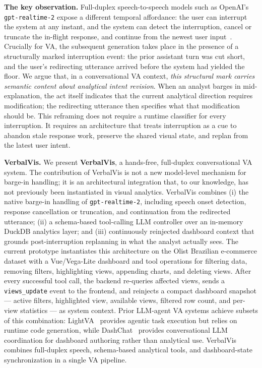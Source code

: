 \documentclass[journal]{IEEEtran}
\begin{document}
\textbf{The key observation.}
Full-duplex speech-to-speech models such as OpenAI's \texttt{gpt-realtime-2} expose a different temporal affordance: the user can interrupt the system at any instant, and the system can detect the interruption, cancel or truncate the in-flight response, and continue from the newest user input~\cite{openai_realtime_docs}. Crucially for VA, the subsequent generation takes place in the presence of a structurally marked interruption event: the prior assistant turn was cut short, and the user's redirecting utterance arrived before the system had yielded the floor. We argue that, in a conversational VA context, \emph{this structural mark carries semantic content about analytical intent revision}. When an analyst barges in mid-explanation, the act itself indicates that the current analytical direction requires modification; the redirecting utterance then specifies what that modification should be. This reframing does not require a runtime classifier for every interruption. It requires an architecture that treats interruption as a cue to abandon stale response work, preserve the shared visual state, and replan from the latest user intent.

\textbf{VerbalVis.}
We present \textbf{VerbalVis}, a hands-free, full-duplex conversational VA system. The contribution of VerbalVis is not a new model-level mechanism for barge-in handling; it is an architectural integration that, to our knowledge, has not previously been instantiated in visual analytics. VerbalVis combines (i) the native barge-in handling of \texttt{gpt-realtime-2}, including speech onset detection, response cancellation or truncation, and continuation from the redirected utterance; (ii) a schema-based tool-calling LLM controller over an in-memory DuckDB analytics layer; and (iii) continuously reinjected dashboard context that grounds post-interruption replanning in what the analyst actually sees. The current prototype instantiates this architecture on the Olist Brazilian e-commerce dataset with a Vue/Vega-Lite dashboard and tool operations for filtering data, removing filters, highlighting views, appending charts, and deleting views. After every successful tool call, the backend re-queries affected views, sends a \texttt{views\_update} event to the frontend, and reinjects a compact dashboard snapshot --- active filters, highlighted view, available views, filtered row count, and per-view statistics --- as system context. Prior LLM-agent VA systems achieve subsets of this combination: LightVA~\cite{zhao2024lightva} provides agentic task execution but relies on runtime code generation, while DashChat~\cite{cheng2025dashchat} provides conversational LLM coordination for dashboard authoring rather than analytical use. VerbalVis combines full-duplex speech, schema-based analytical tools, and dashboard-state synchronization in a single VA pipeline.
\end{document}
